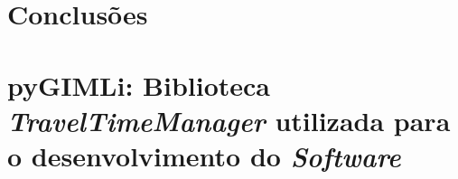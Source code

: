 \documentclass[a4paper, 12 pt]{article} %
\begin{document}
\blindtext 
%
\blindtext 
%
\blindtext

\clearpage


\section{Conclusões}

\blindtext 
%
\blindtext 
%
\blindtext


\clearpage






\clearpage


\appendix
\section{pyGIMLi: Biblioteca \textit{TravelTimeManager} utilizada para o desenvolvimento do \emph{Software}}
\label{apendice_scr}
\end{document}
